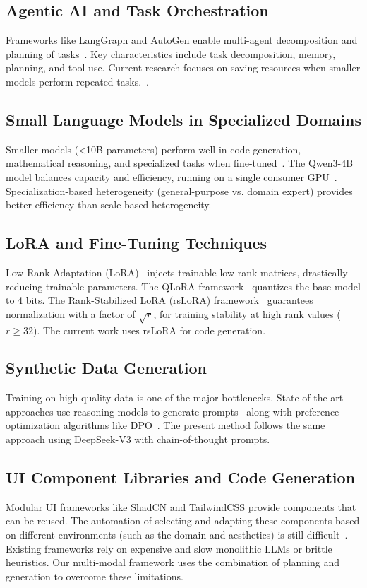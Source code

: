 \documentclass[conference]{IEEEtran}
\begin{document}
\subsection{Agentic AI and Task Orchestration}
Frameworks like LangGraph and AutoGen enable multi-agent decomposition and planning of tasks~\cite{ref3}. Key characteristics include task decomposition, memory, planning, and tool use. Current research focuses on saving resources when smaller models perform repeated tasks.~\cite{ref1}.

\subsection{Small Language Models in Specialized Domains}
Smaller models (<10B parameters) perform well in code generation, mathematical reasoning, and specialized tasks when fine-tuned~\cite{ref4}. The Qwen3-4B model balances capacity and efficiency, running on a single consumer GPU~\cite{ref5}. Specialization-based heterogeneity (general-purpose vs. domain expert) provides better efficiency than scale-based heterogeneity.

\subsection{LoRA and Fine-Tuning Techniques}
Low-Rank Adaptation (LoRA)~\cite{ref12} injects trainable low-rank matrices, drastically reducing trainable parameters. The QLoRA framework~\cite{ref13} quantizes the base model to 4 bits. The Rank-Stabilized LoRA (rsLoRA) framework~\cite{ref17} guarantees normalization with a factor of $\sqrt{r}$, for training stability at high rank values ($r\ge32$). The current work uses rsLoRA for code generation.

\subsection{Synthetic Data Generation}
Training on high-quality data is one of the major bottlenecks. State-of-the-art approaches use reasoning models to generate prompts~\cite{ref6} along with preference optimization algorithms like DPO~\cite{ref7}. The present method follows the same approach using DeepSeek-V3 with chain-of-thought prompts.

\subsection{UI Component Libraries and Code Generation}
Modular UI frameworks like ShadCN and TailwindCSS provide components that can be reused. The automation of selecting and adapting these components based on different environments (such as the domain and aesthetics) is still difficult~\cite{ref9}. Existing frameworks rely on expensive and slow monolithic LLMs or brittle heuristics. Our multi-modal framework uses the combination of planning and generation to overcome these limitations.
\end{document}
